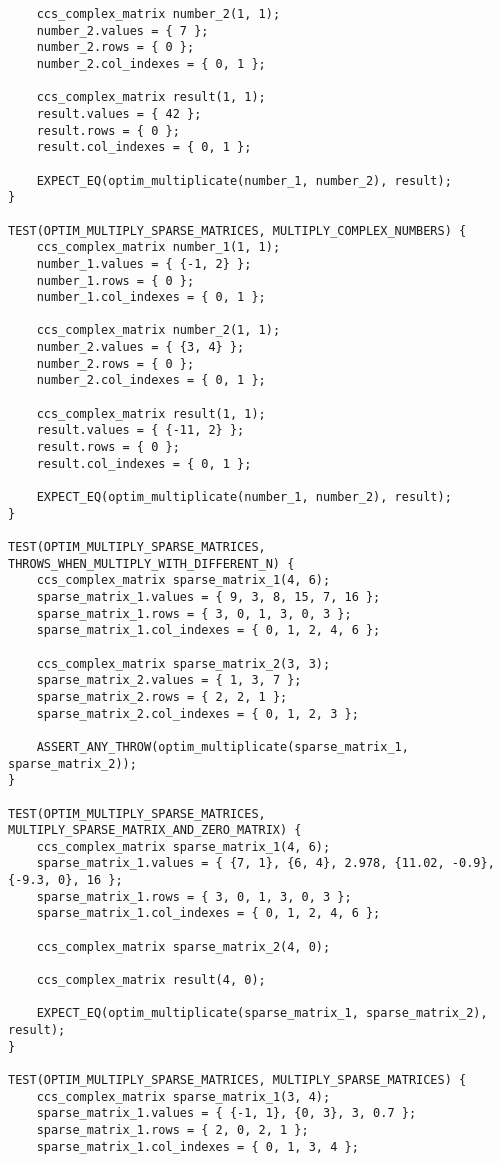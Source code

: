 \documentclass{report}
\begin{document}
\begin{lstlisting}
    ccs_complex_matrix number_2(1, 1);
    number_2.values = { 7 };
    number_2.rows = { 0 };
    number_2.col_indexes = { 0, 1 };
    
    ccs_complex_matrix result(1, 1);
    result.values = { 42 };
    result.rows = { 0 };
    result.col_indexes = { 0, 1 };

    EXPECT_EQ(optim_multiplicate(number_1, number_2), result);
}

TEST(OPTIM_MULTIPLY_SPARSE_MATRICES, MULTIPLY_COMPLEX_NUMBERS) {
    ccs_complex_matrix number_1(1, 1);
    number_1.values = { {-1, 2} };
    number_1.rows = { 0 };
    number_1.col_indexes = { 0, 1 };
    
    ccs_complex_matrix number_2(1, 1);
    number_2.values = { {3, 4} };
    number_2.rows = { 0 };
    number_2.col_indexes = { 0, 1 };
    
    ccs_complex_matrix result(1, 1);
    result.values = { {-11, 2} };
    result.rows = { 0 };
    result.col_indexes = { 0, 1 };

    EXPECT_EQ(optim_multiplicate(number_1, number_2), result);
}

TEST(OPTIM_MULTIPLY_SPARSE_MATRICES, THROWS_WHEN_MULTIPLY_WITH_DIFFERENT_N) {
    ccs_complex_matrix sparse_matrix_1(4, 6);
    sparse_matrix_1.values = { 9, 3, 8, 15, 7, 16 };
    sparse_matrix_1.rows = { 3, 0, 1, 3, 0, 3 };
    sparse_matrix_1.col_indexes = { 0, 1, 2, 4, 6 };
    
    ccs_complex_matrix sparse_matrix_2(3, 3);
    sparse_matrix_2.values = { 1, 3, 7 };
    sparse_matrix_2.rows = { 2, 2, 1 };
    sparse_matrix_2.col_indexes = { 0, 1, 2, 3 };
    
    ASSERT_ANY_THROW(optim_multiplicate(sparse_matrix_1, sparse_matrix_2));
}

TEST(OPTIM_MULTIPLY_SPARSE_MATRICES, MULTIPLY_SPARSE_MATRIX_AND_ZERO_MATRIX) {
    ccs_complex_matrix sparse_matrix_1(4, 6);
    sparse_matrix_1.values = { {7, 1}, {6, 4}, 2.978, {11.02, -0.9}, {-9.3, 0}, 16 };
    sparse_matrix_1.rows = { 3, 0, 1, 3, 0, 3 };
    sparse_matrix_1.col_indexes = { 0, 1, 2, 4, 6 };
    
    ccs_complex_matrix sparse_matrix_2(4, 0);
    
    ccs_complex_matrix result(4, 0);

    EXPECT_EQ(optim_multiplicate(sparse_matrix_1, sparse_matrix_2), result);
}

TEST(OPTIM_MULTIPLY_SPARSE_MATRICES, MULTIPLY_SPARSE_MATRICES) {
    ccs_complex_matrix sparse_matrix_1(3, 4);
    sparse_matrix_1.values = { {-1, 1}, {0, 3}, 3, 0.7 };
    sparse_matrix_1.rows = { 2, 0, 2, 1 };
    sparse_matrix_1.col_indexes = { 0, 1, 3, 4 };
    

\end{lstlisting}
\end{document}
